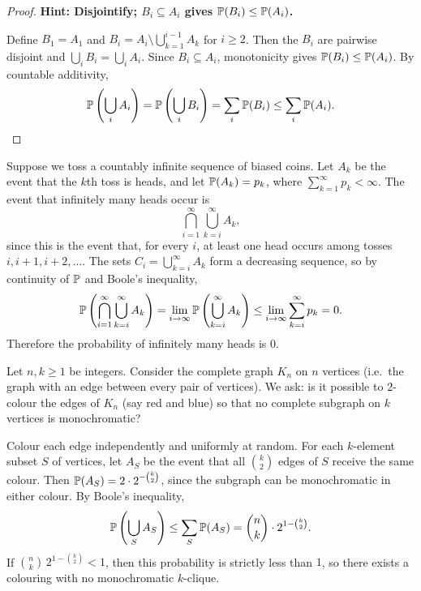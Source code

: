 \documentclass[a4paper]{article}
\begin{document}
\begin{proof}
  \textbf{Hint: Disjointify; $B_i \subseteq A_i$ gives $\P(B_i) \leq \P(A_i)$.}

  Define $B_1 = A_1$ and $B_i = A_i\setminus \bigcup_{k = 1}^{i - 1}A_k$ for $i \geq 2$. Then the $B_i$ are pairwise disjoint and $\bigcup_i B_i = \bigcup_i A_i$. Since $B_i \subseteq A_i$, monotonicity gives $\P(B_i) \leq \P(A_i)$. By countable additivity,
  \[
    \P\left(\bigcup_i A_i\right) = \P\left(\bigcup _i B_i\right) = \sum_i \P(B_i) \leq \sum_i \P(A_i).\qedhere
  \]
\end{proof}

\begin{eg}
  Suppose we toss a countably infinite sequence of biased coins. Let $A_k$ be the event that the $k$th toss is heads, and let $\P(A_k) = p_k$, where $\sum_{k=1}^\infty p_k < \infty$. The event that infinitely many heads occur is
  \[
    \bigcap_{i = 1}^\infty\bigcup_{k = i}^\infty A_k,
  \]
  since this is the event that, for every $i$, at least one head occurs among tosses $i, i+1, i+2, \dotsc$. The sets $C_i = \bigcup_{k=i}^{\infty} A_k$ form a decreasing sequence, so by continuity of $\P$ and Boole's inequality,
  \[
    \P\left(\bigcap_{i = 1}^\infty\bigcup _{k = i}^\infty A_k\right) = \lim_{i \to \infty} \P\left(\bigcup_{k = i}^\infty A_k\right) \leq \lim_{i\to \infty}\sum_{k = i}^\infty p_k = 0.
  \]
  Therefore the probability of infinitely many heads is $0$.
\end{eg}

\begin{eg}
  Let $n, k \geq 1$ be integers. Consider the complete graph $K_n$ on $n$ vertices (i.e.\ the graph with an edge between every pair of vertices). We ask: is it possible to $2$-colour the edges of $K_n$ (say red and blue) so that no complete subgraph on $k$ vertices is monochromatic?

  Colour each edge independently and uniformly at random. For each $k$-element subset $S$ of vertices, let $A_S$ be the event that all $\binom{k}{2}$ edges of $S$ receive the same colour. Then $\P(A_S) = 2 \cdot 2^{-\binom{k}{2}}$, since the subgraph can be monochromatic in either colour. By Boole's inequality,
  \[
    \P\left(\bigcup_S A_S\right) \leq \sum_S \P(A_S) = \binom{n}{k}\cdot 2^{1 - \binom{k}{2}}.
  \]
  If $\binom{n}{k}\, 2^{1 - \binom{k}{2}} < 1$, then this probability is strictly less than $1$, so there exists a colouring with no monochromatic $k$-clique.
\end{eg}
\end{document}
